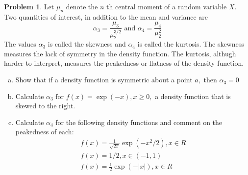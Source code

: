 \documentclass{article}
\theoremstyle{definition}
\newtheorem{problem}{Problem}
\begin{document}
\begin{problem}
Let $\mu_{n}$ denote the $n$ th central moment of a random variable $X .$ Two quantities of interest, in addition to the mean and variance are
$$
\alpha_{3}=\frac{\mu_{3}}{\mu_{2}^{3 / 2}} \text { and } \alpha_{4}=\frac{\mu_{4}}{\mu_{2}^{2}}
$$
The values $\alpha_{3}$ is called the skewness and $\alpha_{4}$ is called the kurtosis. The skewness measures the
lack of symmetry in the density function. The kurtosis, althugh harder to interpret, measures
the peakedness or flatness of the density function.
\begin{enumerate}[(a)]
    \item Show that if a density function is symmetric about a point $a,$ then $\alpha_{3}=0$
    \item Calculate $\alpha_{3}$ for $f(x)=\exp (-x), x \geq 0,$ a density function that is skewed to the right.
    \item Calculate $\alpha_{4}$ for the following density functions and comment on the peakedness of each:
    $$
    \begin{array}{l}
        f(x)=\frac{1}{\sqrt{2 \pi}} \exp \left(-x^{2} / 2\right), x \in R \\
        f(x)=1 / 2, x \in(-1,1) \\
        f(x)=\frac{1}{2} \exp (-|x|), x \in R
    \end{array}
    $$
\end{enumerate}  
\end{problem}
\end{document}

